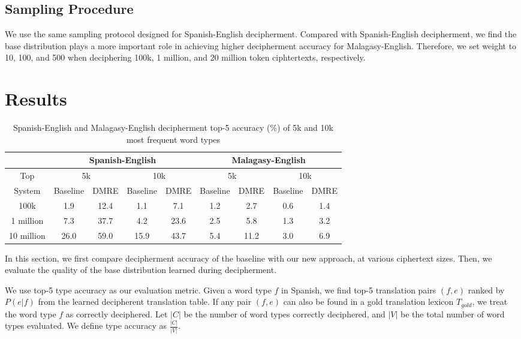 \subsection{Sampling Procedure}

We use the same sampling protocol designed for Spanish-English decipherment. Compared with Spanish-English decipherment, we find the base distribution plays a more important role in achieving higher decipherment accuracy for Malagasy-English. Therefore, we set weight to 10, 100, and 500 when deciphering 100k, 1 million, and 20 million token ciphtertexts, respectively.


\section{Results}

%
 \begin{table}[!ht]
 \begin{center}
 \begin{tabular}{ |c|c|c|c|c|c|c|c|c| } \hline
         & \multicolumn{4}{|c|}{Spanish-English} & \multicolumn{4}{|c|}{Malagasy-English} \\ \hline
 Top &  \multicolumn{2}{|c|}{5k} & \multicolumn{2}{|c|}{10k} & \multicolumn{2}{|c|}{5k} & \multicolumn{2}{|c|}{10k} \\ \hline
 System &  Baseline & DMRE & Baseline & DMRE &  Baseline & DMRE & Baseline & DMRE \\ \hline
 100k &  1.9 & 12.4 & 1.1 & 7.1 &  1.2 & 2.7 & 0.6 & 1.4 \\ \hline
 1 million &  7.3 & 37.7& 4.2 & 23.6 &  2.5 & 5.8 & 1.3 & 3.2 \\ \hline
 10 million &  26.0 & 59.0 & 15.9 & 43.7 &  5.4 & 11.2 & 3.0 & 6.9 \\ \hline
 \end{tabular}
 \caption{Spanish-English and Malagasy-English decipherment top-5 accuracy (\%) of 5k and 10k most frequent word types}
 \label{decipher-acc-result}
 \end{center}
 \end{table}
%

In this section, we first compare decipherment accuracy of the baseline with our new approach, at various ciphertext sizes. Then, we evaluate the quality of the base distribution learned during decipherment.

We use top-5 type accuracy as our evaluation metric.  Given a word type $f$ in Spanish, we find top-5 translation pairs $(f,e)$ ranked by $P(e|f)$ from the learned decipherent translation table. If any pair $(f,e)$ can also be found in a gold translation lexicon $T_{gold}$, we treat the word type $f$ as correctly deciphered. Let $|C|$ be the number of word types correctly deciphered, and $|V|$ be the total number of word types evaluated. We define type accuracy as $\frac{|C|}{|V|}$.

